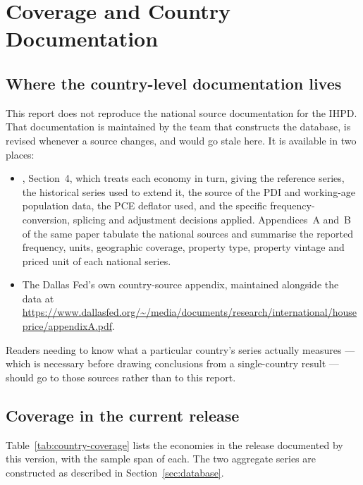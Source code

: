 \section{Coverage and Country Documentation}
\label{app:countries}

\subsection*{Where the country-level documentation lives}

This report does not reproduce the national source documentation for the
IHPD. That documentation is maintained by the team that constructs the
database, is revised whenever a source changes, and would go stale here. It
is available in two places:

\begin{itemize}
  \item \citet{mack2011}, Section~4, which treats each economy in turn,
        giving the reference series, the historical series used to extend it,
        the source of the PDI and working-age population data, the PCE
        deflator used, and the specific frequency-conversion, splicing and
        adjustment decisions applied. Appendices~A and~B of the same paper
        tabulate the national sources and summarise the reported frequency,
        units, geographic coverage, property type, property vintage and
        priced unit of each national series.

  \item The Dallas Fed's own country-source appendix, maintained alongside
        the data at
        \url{https://www.dallasfed.org/~/media/documents/research/international/houseprice/appendixA.pdf}.
\end{itemize}

\noindent Readers needing to know what a particular country's series
actually measures --- which is necessary before drawing conclusions from a
single-country result --- should go to those sources rather than to this
report.

\subsection*{Coverage in the current release}

Table~\ref{tab:country-coverage} lists the economies in the release
documented by this version, with the sample span of each. The two aggregate
series are constructed as described in Section~\ref{sec:database}.

